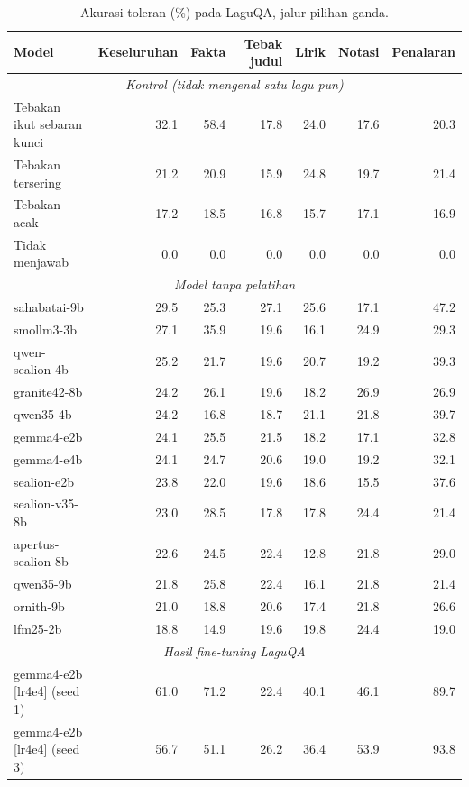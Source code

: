 \begin{table}[t]
\centering
\small
\caption{Akurasi toleran (\%) pada LaguQA, jalur pilihan ganda.}
\begin{tabular}{lrrrrrr}
\toprule
\textbf{Model} & \textbf{Keseluruhan} & \textbf{Fakta} & \textbf{Tebak judul} & \textbf{Lirik} & \textbf{Notasi} & \textbf{Penalaran} \\
\midrule
\multicolumn{7}{c}{\textit{Kontrol (tidak mengenal satu lagu pun)}} \\
Tebakan ikut sebaran kunci & 32.1 & 58.4 & 17.8 & 24.0 & 17.6 & 20.3 \\
Tebakan tersering & 21.2 & 20.9 & 15.9 & 24.8 & 19.7 & 21.4 \\
Tebakan acak & 17.2 & 18.5 & 16.8 & 15.7 & 17.1 & 16.9 \\
Tidak menjawab & 0.0 & 0.0 & 0.0 & 0.0 & 0.0 & 0.0 \\
\midrule
\multicolumn{7}{c}{\textit{Model tanpa pelatihan}} \\
sahabatai-9b & 29.5 & 25.3 & 27.1 & 25.6 & 17.1 & 47.2 \\
smollm3-3b & 27.1 & 35.9 & 19.6 & 16.1 & 24.9 & 29.3 \\
qwen-sealion-4b & 25.2 & 21.7 & 19.6 & 20.7 & 19.2 & 39.3 \\
granite42-8b & 24.2 & 26.1 & 19.6 & 18.2 & 26.9 & 26.9 \\
qwen35-4b & 24.2 & 16.8 & 18.7 & 21.1 & 21.8 & 39.7 \\
gemma4-e2b & 24.1 & 25.5 & 21.5 & 18.2 & 17.1 & 32.8 \\
gemma4-e4b & 24.1 & 24.7 & 20.6 & 19.0 & 19.2 & 32.1 \\
sealion-e2b & 23.8 & 22.0 & 19.6 & 18.6 & 15.5 & 37.6 \\
sealion-v35-8b & 23.0 & 28.5 & 17.8 & 17.8 & 24.4 & 21.4 \\
apertus-sealion-8b & 22.6 & 24.5 & 22.4 & 12.8 & 21.8 & 29.0 \\
qwen35-9b & 21.8 & 25.8 & 22.4 & 16.1 & 21.8 & 21.4 \\
ornith-9b & 21.0 & 18.8 & 20.6 & 17.4 & 21.8 & 26.6 \\
lfm25-2b & 18.8 & 14.9 & 19.6 & 19.8 & 24.4 & 19.0 \\
\midrule
\multicolumn{7}{c}{\textit{Hasil fine-tuning LaguQA}} \\
gemma4-e2b [lr4e4] (seed 1) & 61.0 & 71.2 & 22.4 & 40.1 & 46.1 & 89.7 \\
gemma4-e2b [lr4e4] (seed 3) & 56.7 & 51.1 & 26.2 & 36.4 & 53.9 & 93.8 \\

\end{tabular}
\end{table}
